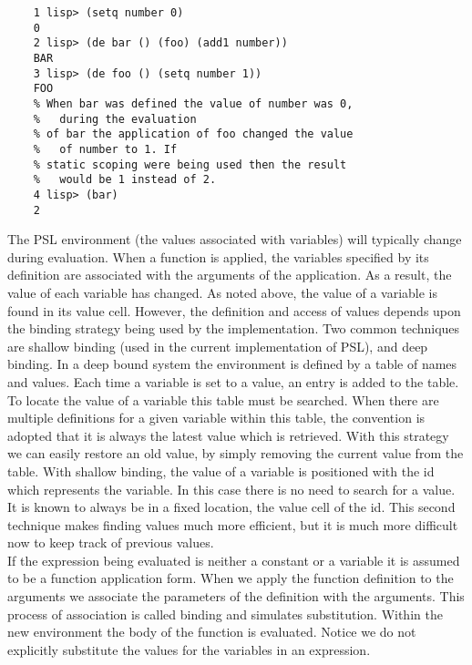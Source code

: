 \begin{verbatim}
    1 lisp> (setq number 0)
    0
    2 lisp> (de bar () (foo) (add1 number))
    BAR
    3 lisp> (de foo () (setq number 1))
    FOO
    % When bar was defined the value of number was 0,
    %	during the evaluation
    % of bar the application of foo changed the value 
    %	of number to 1. If
    % static scoping were being used then the result
    %	would be 1 instead of 2.
    4 lisp> (bar)
    2
\end{verbatim}
    The  PSL  environment (the values associated with variables)
    will typically change during evaluation.  When a function is
    applied, the  variables  specified  by  its  definition  are
    associated  with  the  arguments  of  the application.  As a
    result, the value of each variable has changed.    As  noted
    above,  the  value of a variable is found in its value cell.
    However, the definition and access of  values  depends  upon
    the  binding strategy being used by the implementation.  Two
    common techniques are shallow binding (used in  the  current
    implementation  of  PSL), and deep binding.  In a deep bound
    system the environment is defined by a table  of  names  and
    values.  Each time a variable is set to a value, an entry is
    added  to the table.  To locate the value of a variable this
    table must be searched.  When there are multiple definitions
    for a given variable within this table,  the  convention  is
    adopted  that  it  is  always  the  latest  value  which  is
    retrieved.  With this strategy we can easily restore an  old
    value,  by simply removing the current value from the table.
    With shallow binding, the value of a variable is  positioned
    with  the  id  which  represents the variable.  In this case
    there is no need to search for a value.    It  is  known  to
    always  be  in  a  fixed location, the value cell of the id.
    This  second  technique  makes  finding  values  much   more
    efficient,  but  it is much more difficult now to keep track
    of previous values.\\

    If the expression being evaluated is neither a constant or a
    variable it is assumed to be a  function  application  form.
    When  we  apply  the function definition to the arguments we
    associate  the  parameters  of  the  definition   with   the
    arguments.    This  process of association is called binding
    and simulates substitution.  Within the new environment  the
    body  of  the  function  is  evaluated.    Notice  we do not
    explicitly substitute the values for  the  variables  in  an
    expression.

